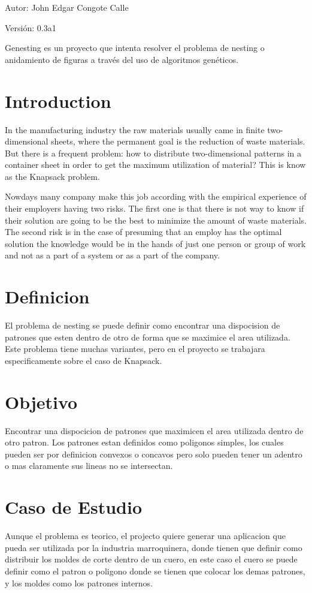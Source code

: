 \begin{Desc}
\item[Autor:]John Edgar Congote Calle \end{Desc}
\begin{Desc}
\item[Versi\'{o}n:]0.3a1\end{Desc}
Genesting es un proyecto que intenta resolver el problema de nesting o anidamiento de figuras a trav\'{e}s del uso de algoritmos gen\'{e}ticos.\hypertarget{index_Introduction}{}\section{Introduction}\label{index_Introduction}
In the manufacturing industry the raw materials usually came in finite two-dimensional sheets, where the permanent goal is the reduction of waste materials. But there is a frequent problem: how to distribute two-dimensional patterns in a container sheet in order to get the maximum utilization of material? This is know as the Knapsack problem.

Nowdays many company make this job according with the empirical experience of their employers having two risks. The first one is that there is not way to know if their solution are going to be the best to minimize the amount of waste materials. The second risk is in the case of presuming that an employ has the optimal solution the knowledge would be in the hands of just one person or group of work and not as a part of a system or as a part of the company.\hypertarget{index_definition}{}\section{Definicion}\label{index_definition}
El problema de nesting se puede definir como encontrar una dispocision de patrones que esten dentro de otro de forma que se maximice el area utilizada. Este problema tiene muchas variantes, pero en el proyecto se trabajara especificamente sobre el caso de Knapsack.\hypertarget{index_objective}{}\section{Objetivo}\label{index_objective}
Encontrar una dispocicion de patrones que maximicen el area utilizada dentro de otro patron. Los patrones estan definidos como poligonos simples, los cuales pueden ser por definicion convexos o concavos pero solo pueden tener un adentro o mas claramente sus lineas no se intersectan.\hypertarget{index_case}{}\section{Caso de Estudio}\label{index_case}
Aunque el problema es teorico, el projecto quiere generar una aplicacion que pueda ser utilizada por la industria marroquinera, donde tienen que definir como distribuir los moldes de corte dentro de un cuero, en este caso el cuero se puede definir como el patron o poligono donde se tienen que colocar los demas patrones, y los moldes como los patrones internos. 